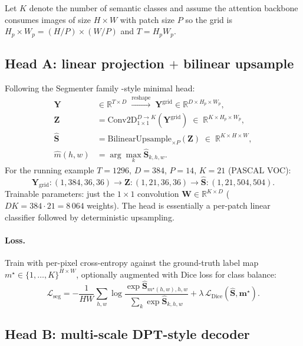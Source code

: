 \documentclass[11pt,a4paper]{article}
\begin{document}
Let $K$ denote the number of semantic classes and assume the
attention backbone consumes images of size $H\!\times\!W$ with patch
size $P$ so the grid is $H_p\!\times\!W_p = (H/P)\!\times\!(W/P)$ and
$T = H_p W_p$.

\subsection{Head A: linear projection $+$ bilinear upsample}
\label{sec:seg-A}

Following the Segmenter family \cite{vssd}-style minimal head:
\begin{align}
  \bm{Y} &\in\mathbb{R}^{T\times D}
       \;\xrightarrow{\text{reshape}}\;
       \bm{Y}^{\text{grid}}\in\mathbb{R}^{D\times H_p\times W_p}, \\
  \bm{Z} &= \mathrm{Conv2D}_{1\times 1}^{D\to K}(\bm{Y}^{\text{grid}})
       \;\in\;\mathbb{R}^{K\times H_p\times W_p}, \label{eq:seg-A-logits}\\
  \widehat{\bm{S}} &= \mathrm{BilinearUpsample}_{\times P}(\bm{Z})
       \;\in\;\mathbb{R}^{K\times H\times W}, \\
  \widehat{m}(h,w) &= \arg\max_{k}\widehat{\bm{S}}_{k,h,w}.
\end{align}
For the running example $T\!=\!1296$, $D\!=\!384$, $P\!=\!14$,
$K\!=\!21$ (PASCAL VOC):
\begin{equation}
  \bm{Y}_{\text{grid}}:(1,384,36,36)
   \to \bm{Z}:(1,21,36,36)
   \to \widehat{\bm{S}}:(1,21,504,504).
\end{equation}
Trainable parameters: just the $1{\times}1$ convolution
$\bm{W}\in\mathbb{R}^{K\times D}$ ($D K = 384\cdot 21 = 8\,064$
weights). The head is essentially a per-patch linear classifier
followed by deterministic upsampling.

\paragraph{Loss.} Train with per-pixel cross-entropy against the
ground-truth label map $m^\star\in\{1,\dots,K\}^{H\times W}$,
optionally augmented with Dice loss for class balance:
\begin{equation}
  \mathcal{L}_{\text{seg}}
   = -\frac{1}{HW}\sum_{h,w}\log
     \frac{\exp \widehat{\bm{S}}_{m^\star(h,w),h,w}}
          {\sum_{k}\exp \widehat{\bm{S}}_{k,h,w}}
   + \lambda\,\mathcal{L}_{\text{Dice}}(\widehat{\bm{S}},\bm{m}^\star).
\end{equation}

\subsection{Head B: multi-scale DPT-style decoder}
\label{sec:seg-B}
\end{document}
